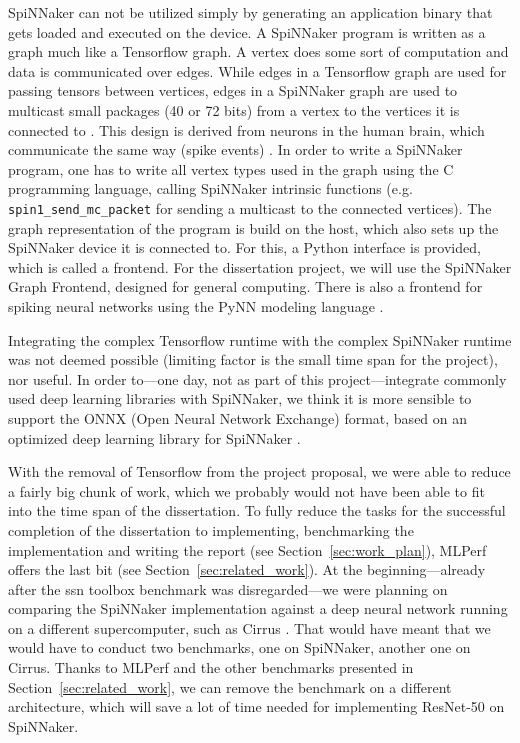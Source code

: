 \documentclass{article}
\begin{document}
SpiNNaker can not be utilized simply by generating an application
binary that gets loaded and executed on the device.
A SpiNNaker program is written as a graph much like a Tensorflow
graph.
A vertex does some sort of computation and data is communicated over
edges.
While edges in a Tensorflow graph are used for passing tensors between
vertices, edges in a SpiNNaker graph are used to multicast small
packages (40 or 72 bits) from a vertex to the vertices it is connected
to \citep{spinn_proj, tf2015}.
This design is derived from neurons in the human brain, which
communicate the same way (spike events) \citep{spinn_proj}.
In order to write a SpiNNaker program, one has to write all vertex
types used in the graph using the C programming language, calling
SpiNNaker intrinsic functions (e.g. \texttt{spin1\_send\_mc\_packet}
for sending a multicast to the connected vertices).
The graph representation of the program is build on the host,
which also sets up the SpiNNaker device it is connected to.
For this, a Python interface is provided, which is called a frontend.
For the dissertation project, we will use the SpiNNaker Graph
Frontend, designed for general computing.
There is also a frontend for spiking neural networks using
the PyNN modeling language \citep{davison_et_al_2009}.

Integrating the complex Tensorflow runtime with the complex
SpiNNaker runtime was not deemed possible (limiting factor is the
small time span for the project), nor useful.
In order to---one day, not as part of this project---integrate
commonly used deep learning libraries with SpiNNaker, we think it
is more sensible to support the ONNX (Open Neural Network Exchange)
format, based on an optimized deep learning library for SpiNNaker
\citep{bai2020}.

With the removal of Tensorflow from the project proposal, we
were able to reduce a fairly big chunk of work, which we
probably would not have been able to fit into the time
span of the dissertation.
To fully reduce the tasks for the successful
completion of the dissertation to implementing,
benchmarking the implementation and writing the report
(see Section~\ref{sec:work_plan}), MLPerf offers the last
bit (see Section~\ref{sec:related_work}).
At the beginning---already after the ssn toolbox benchmark
was disregarded---we were planning on comparing the
SpiNNaker implementation against a deep neural network
running on a different supercomputer, such as Cirrus
\citep{cirrus}.
That would have meant that we would have to conduct two
benchmarks, one on SpiNNaker, another one on Cirrus.
Thanks to MLPerf and the other benchmarks presented in
Section~\ref{sec:related_work}, we can remove the
benchmark on a different architecture, which will save
a lot of time needed for implementing ResNet-50 on
SpiNNaker.
\end{document}
